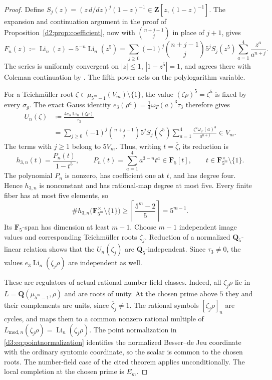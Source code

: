 \documentclass[11pt,a4paper]{amsart}
\numberwithin{equation}{section}
\theoremstyle{definition}
\theoremstyle{remark}
\begin{document}
\begin{proof}
Define
$S_j(z)=(z\,d/dz)^j(1-z)^{-1}\in\mathbf Z[z,(1-z)^{-1}]$.
The expansion and continuation argument in
the proof of Proposition~\ref{d2:prop:coefficient}, now with
$\binom{n+j-1}{j}$ in place of $j+1$, gives
\[
 F_n(z)\coloneqq \operatorname{Li}_n(z)-5^{-n}\operatorname{Li}_n(z^5)
 =\sum_{j\geq0}(-1)^j\binom{n+j-1}{j}5^j S_j(z^5)
             \sum_{a=1}^4\frac{z^a}{a^{n+j}}.
\]
The series is uniformly convergent on $|z|\leq1$,
$|1-z^5|=1$, and agrees there with Coleman continuation by
\cite[Theorem~2.7(3)]{BesserDeJeuAlgorithm}.
The fifth power acts on the polylogarithm variable.

For a Teichm\"uller root
$\zeta\in\mu_{5^m-1}(V_m)\setminus\{1\}$, the value
$(\zeta\rho)^5=\zeta^5$ is fixed by every $\sigma_g$.
The exact Gauss identity
$e_3(\rho^a)=\frac14\omega_T(a)^3\tau_3$ therefore gives
\begin{equation}
\label{d2ext:dimtwoVisibleHigherDepletion}
\begin{split}
 U_n(\zeta)
 &\coloneqq \frac{4e_3\operatorname{Li}_n(\zeta\rho)}{\tau_3}\\
 &=\sum_{j\geq0}(-1)^j\binom{n+j-1}{j}5^j S_j(\zeta^5)
        \sum_{a=1}^4\frac{\zeta^a\omega_T(a)^3}{a^{n+j}}
       \in V_m.
\end{split}
\end{equation}
The terms with $j\geq1$ belong to $5V_m$.  Thus, writing
$t=\overline\zeta$, its reduction is
\[
 h_{3,n}(t)
   =\frac{P_n(t)}{1-t^5},\qquad
 P_n(t)=\sum_{a=1}^4a^{3-n}t^a\in\mathbf F_5[t],
 \qquad t\in\mathbf F_{5^m}^{\times}\setminus\{1\}.
\]
The polynomial $P_n$ is nonzero, has coefficient one at $t$,
and has degree four.  Hence $h_{3,n}$ is nonconstant and has
rational-map degree at most five.  Every finite fiber has at most
five elements, so
\[
 \#h_{3,n}\bigl(\mathbf F_{5^m}^{\times}\setminus\{1\}\bigr)
 \geq\left\lceil\frac{5^m-2}{5}\right\rceil=5^{m-1}.
\]
Its $\mathbf F_5$-span has dimension at least $m-1$.
Choose $m-1$ independent image values and corresponding
Teichm\"uller roots $\zeta_j$.  Reduction of a normalized
$\mathbf Q_5$-linear relation shows that the $U_n(\zeta_j)$
are $\mathbf Q_5$-independent.  Since $\tau_3\ne0$, the values
$e_3\operatorname{Li}_n(\zeta_j\rho)$ are independent as well.

These are regulators of actual rational number-field classes.
Indeed, all $\zeta_j\rho$ lie in
$L=\mathbf Q(\mu_{5^m-1},\rho)$ and are roots of unity.
At the chosen prime above $5$ they and their complements are
units, since $\overline\zeta_j\ne1$.  The rational symbols
$[\zeta_j\rho]_n$ are cycles, and
\cite[Theorem~1.10(2)]{BesserDeJeu} maps them to a common
nonzero rational multiple of
$L_{\mathrm{mod},n}(\zeta_j\rho)
 =\operatorname{Li}_n(\zeta_j\rho)$.
The point normalization in \eqref{d3:eq:pointnormalization}
identifies the normalized Besser--de Jeu coordinate with the
ordinary syntomic coordinate, so the scalar is common to the
chosen roots. The number-field case of the cited theorem applies
unconditionally. The local completion at the chosen prime is $E_m$.


\end{proof}
\end{document}
